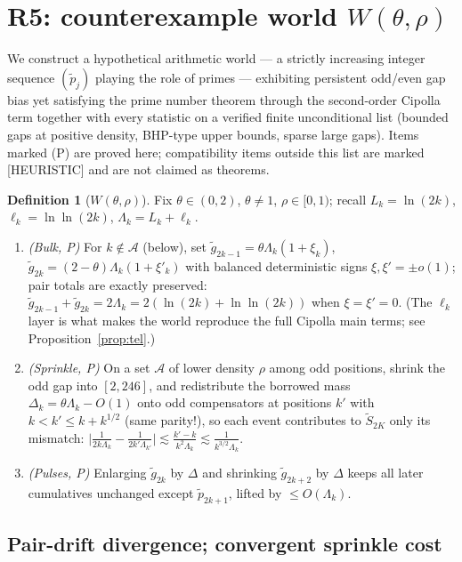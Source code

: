 \documentclass[11pt]{article}
\theoremstyle{definition}
\newtheorem{definition}[theorem]{Definition}
\begin{document}
\section{R5: counterexample world \texorpdfstring{$W(\theta,\rho)$}{W(theta,rho)}}\label{sec:r5}

We construct a hypothetical arithmetic world --- a strictly increasing integer sequence $(\tilde p_j)$ playing the role of primes --- exhibiting persistent odd/even gap bias yet satisfying the prime number theorem through the second-order Cipolla term together with every statistic on a verified finite unconditional list (bounded gaps at positive density, BHP-type upper bounds, sparse large gaps). Items marked (P) are proved here; compatibility items outside this list are marked [HEURISTIC] and are not claimed as theorems.

\begin{definition}[$W(\theta,\rho)$]\label{def:world}
Fix $\theta\in(0,2)$, $\theta\ne1$, $\rho\in[0,1)$; recall $L_k=\ln(2k)$, $\ell_k=\ln\ln(2k)$, $\Lambda_k=L_k+\ell_k$.
\begin{enumerate}\itemsep2pt
\item \emph{(Bulk, P)} For $k\notin\mathcal A$ (below), set $\tilde g_{2k-1}=\theta\Lambda_k(1+\xi_k)$, $\tilde g_{2k}=(2-\theta)\Lambda_k(1+\xi'_k)$ with balanced deterministic signs $\xi,\xi'=\pm o(1)$; pair totals are exactly preserved: $\tilde g_{2k-1}+\tilde g_{2k}=2\Lambda_k=2(\ln(2k)+\ln\ln(2k))$ when $\xi=\xi'=0$. (The $\ell_k$ layer is what makes the world reproduce the full Cipolla main terms; see Proposition~\ref{prop:tel}.)
\item \emph{(Sprinkle, P)} On a set $\mathcal A$ of lower density $\rho$ among odd positions, shrink the odd gap into $[2,246]$, and redistribute the borrowed mass $\Delta_k=\theta\Lambda_k-O(1)$ onto odd compensators at positions $k'$ with $k<k'\le k+k^{1/2}$ (same parity!), so each event contributes to $\tilde S_{2K}$ only its mismatch: $\bigl|\frac{1}{2k\Lambda_k}-\frac{1}{2k'\Lambda_{k'}}\bigr|\lesssim\frac{k'-k}{k^2\Lambda_k}\lesssim\frac{1}{k^{3/2}\Lambda_k}$.
\item \emph{(Pulses, P)} Enlarging $\tilde g_{2k}$ by $\Delta$ and shrinking $\tilde g_{2k+2}$ by $\Delta$ keeps all later cumulatives unchanged except $\tilde p_{2k+1}$, lifted by $\le O(\Lambda_k)$.
\end{enumerate}
\end{definition}

\subsection{Pair-drift divergence; convergent sprinkle cost}
\end{document}
